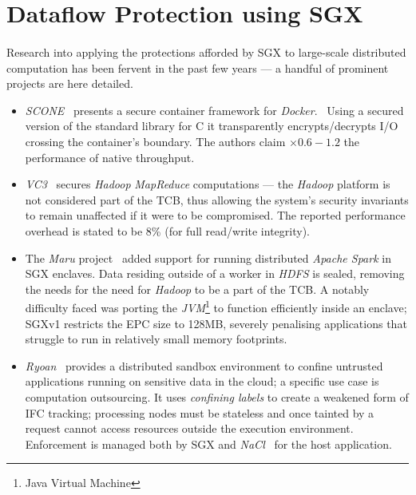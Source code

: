 \section{Dataflow Protection using SGX}
\paragraph{} Research into applying the protections afforded by SGX to large-scale distributed computation has been fervent in the past few years --- a handful of prominent projects are here detailed. 

\begin{itemize}
    \item \textit{SCONE}~\cite{10.5555/3026877.3026930} presents a secure container framework for \textit{Docker}.~\cite{docker-security} Using a secured version of the standard library for C it transparently encrypts/decrypts I/O crossing the container's boundary. The authors claim $\times 0.6-1.2$ the performance of native throughput.
    \item \textit{VC3}~\cite{vc37163017} secures \textit{Hadoop} \textit{MapReduce} computations --- the \textit{Hadoop} platform is not considered part of the TCB, thus allowing the system's security invariants to remain unaffected if it were to be compromised. The reported performance overhead is stated to be 8\% (for full read/write integrity).
    \item The \textit{Maru} project~\cite{maru} added support for running distributed \textit{Apache Spark} in SGX enclaves. Data residing outside of a worker in \textit{HDFS} is sealed, removing the needs for the need for \textit{Hadoop} to be a part of the TCB. A notably difficulty faced was porting the \textit{JVM}\footnote{Java Virtual Machine} to function efficiently inside an enclave; SGXv1 restricts the EPC size to 128MB, severely penalising applications that struggle to run in relatively small memory footprints.
    \item \textit{Ryoan}~\cite{ryoan199358} provides a distributed sandbox environment to confine untrusted applications running on sensitive data in the cloud; a specific use case is computation outsourcing. It uses \textit{confining labels} to create a weakened form of IFC tracking; processing nodes must be stateless and once tainted by a request cannot access resources outside the execution environment. Enforcement is managed both by SGX and \textit{NaCl}~\cite{nacl} for the host application. 
\end{itemize}

